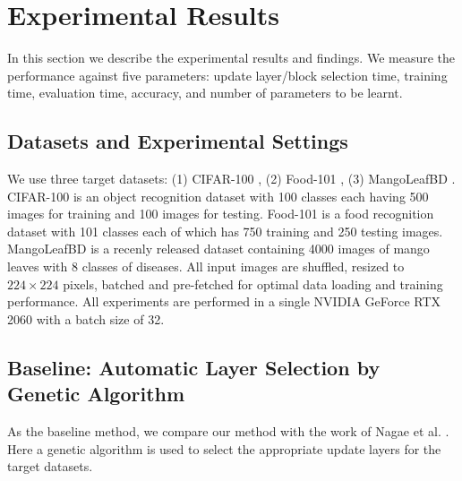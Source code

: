 \documentclass[a4paper,fleqn]{cas-sc}
\begin{document}
\section{Experimental Results}
\label{sec:results}
In this section we describe the experimental results and findings. We measure the performance against five parameters: update layer/block selection time, training time, evaluation time, accuracy, and number of parameters to be learnt.

\subsection{Datasets and Experimental Settings}
We use three target datasets: (1) CIFAR-100 \cite{KrizhevskyHinton2009}, (2) Food-101 \cite{Bossard2014}, (3) MangoLeafBD \cite{mangodata}. CIFAR-100 is an object recognition dataset with 100 classes each having 500 images for training and 100 images for testing. Food-101 is a food recognition dataset with 101 classes each of which has 750 training and 250 testing images. MangoLeafBD is a recenly released dataset containing 4000 images of mango leaves with 8 classes of diseases. All input images are shuffled, resized to $224 \times 224$ pixels, batched and pre-fetched for optimal data loading and training performance. All experiments are performed in a single NVIDIA GeForce RTX 2060 with a batch size of 32. %

\subsection{Baseline: Automatic Layer Selection by Genetic Algorithm}
As the baseline method, we compare our method with the work of Nagae et al. \cite{Nagae2022}. Here a genetic algorithm is used to select the appropriate update layers for the target datasets. %
\end{document}
